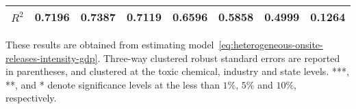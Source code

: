 \begin{table}[H]
{\begin{tabular}{@{}llllllll@{}}
            $R^2$                           & 0.7196    & 0.7387        & 0.7119    & 0.6596       & 0.5858          & 0.4999        & 0.1264              \\ \bottomrule \bottomrule
        \end{tabular}%
    }
    \begin{minipage}{18cm}
        \vspace{0.05in}
        These results are obtained from estimating model~\ref{eq:heterogeneous-onsite-releases-intensity-gdp}. Three-way clustered robust standard errors are reported in parentheses, and clustered at the toxic chemical, industry and state levels. ***, **, and * denote significance levels at the less than $1\%$, $5\%$ and $10\%$, respectively.
    \end{minipage}
\end{table}